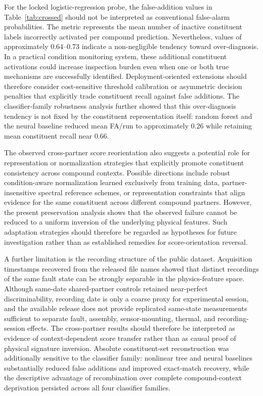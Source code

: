 For the locked logistic-regression probe, the false-addition values in
Table~\ref{tab:crossed} should not be interpreted as conventional
false-alarm probabilities. The metric represents the mean number of
inactive constituent labels incorrectly activated per compound prediction.
Nevertheless, values of approximately 0.64--0.73 indicate a non-negligible
tendency toward over-diagnosis. In a practical condition monitoring system,
these additional constituent activations could increase inspection burden
even when one or both true mechanisms are successfully identified.
Deployment-oriented extensions should therefore consider cost-sensitive
threshold calibration or asymmetric decision penalties that explicitly
trade constituent recall against false additions. The classifier-family
robustness analysis further showed that this over-diagnosis tendency is not
fixed by the constituent representation itself: random forest and the
neural baseline reduced mean FA/run to approximately 0.26 while retaining
mean constituent recall near 0.66.

The observed cross-partner score reorientation also suggests a potential
role for representation or normalization strategies that explicitly promote
constituent consistency across compound contexts. Possible directions
include robust condition-aware normalization learned exclusively from
training data, partner-insensitive spectral reference schemes, or
representation constraints that align evidence for the same constituent
across different compound partners. However, the present preservation
analysis shows that the observed failure cannot be reduced to a uniform
inversion of the underlying physical features. Such adaptation strategies
should therefore be regarded as hypotheses for future investigation rather
than as established remedies for score-orientation reversal.

A further limitation is the recording structure of the public dataset.
Acquisition timestamps recovered from the released file names showed that
distinct recordings of the same fault state can be strongly separable in
the physics-feature space. Although same-date shared-partner controls
retained near-perfect discriminability, recording date is only a coarse
proxy for experimental session, and the available release does not provide
replicated same-state measurements sufficient to separate fault, assembly,
sensor-mounting, thermal, and recording-session effects. The cross-partner
results should therefore be interpreted as evidence of context-dependent
score transfer rather than as causal proof of physical signature inversion.
Absolute constituent-set reconstruction was additionally sensitive to the
classifier family: nonlinear tree and neural baselines substantially
reduced false additions and improved exact-match recovery, while the
descriptive advantage of recombination over complete compound-context
deprivation persisted across all four classifier families.

